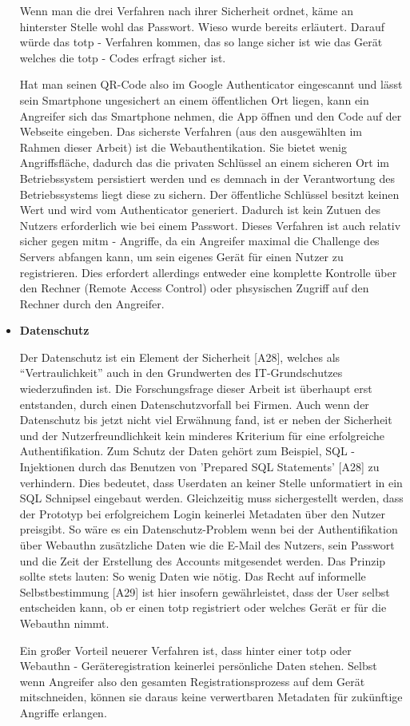 \begin{itemize}
Wenn man die drei Verfahren nach ihrer Sicherheit ordnet, käme an hinterster Stelle wohl das Passwort. Wieso wurde bereits erläutert. Darauf würde das \ac{totp} - Verfahren kommen, das so lange sicher ist wie das Gerät welches die \ac{totp} - Codes erfragt sicher ist.

Hat man seinen QR-Code also im Google Authenticator eingescannt und lässt sein Smartphone ungesichert an einem öffentlichen Ort liegen, kann ein Angreifer sich das Smartphone nehmen, die App öffnen und den Code auf der Webseite eingeben. Das sicherste Verfahren (aus den ausgewählten im Rahmen dieser Arbeit) ist die Webauthentikation. Sie bietet wenig Angriffsfläche, dadurch das die privaten Schlüssel an einem sicheren Ort im Betriebssystem persistiert werden und es demnach in der Verantwortung des Betriebssystems liegt diese zu sichern. Der öffentliche Schlüssel besitzt keinen Wert und wird vom Authenticator generiert. Dadurch ist kein Zutuen des Nutzers erforderlich wie bei einem Passwort. Dieses Verfahren ist auch relativ sicher gegen \ac{mitm} - Angriffe, da ein Angreifer maximal die Challenge des Servers abfangen kann, um sein eigenes Gerät für einen Nutzer zu registrieren. Dies erfordert allerdings entweder eine komplette Kontrolle über den Rechner (Remote Access Control) oder phsysischen Zugriff auf den Rechner durch den Angreifer.

\item \textbf{Datenschutz}

Der Datenschutz ist ein Element der Sicherheit [A28], welches als ``Vertraulichkeit'' auch in den Grundwerten des IT-Grundschutzes wiederzufinden ist. Die Forschungsfrage dieser Arbeit ist überhaupt erst entstanden, durch einen Datenschutzvorfall bei Firmen. Auch wenn der Datenschutz bis jetzt nicht viel Erwähnung fand, ist er neben der Sicherheit und der Nutzerfreundlichkeit kein minderes Kriterium für eine erfolgreiche Authentifikation. Zum Schutz der Daten gehört zum Beispiel, SQL - Injektionen durch das Benutzen von 'Prepared SQL Statements' [A28] zu verhindern. Dies bedeutet, dass Userdaten an keiner Stelle unformatiert in ein SQL Schnipsel eingebaut werden. Gleichzeitig muss sichergestellt werden, dass der Prototyp bei erfolgreichem Login keinerlei Metadaten über den Nutzer preisgibt. So wäre es ein Datenschutz-Problem wenn bei der Authentifikation über Webauthn zusätzliche Daten wie die E-Mail des Nutzers, sein Passwort und die Zeit der Erstellung des Accounts mitgesendet werden. Das Prinzip sollte stets lauten: So wenig Daten wie nötig. Das Recht auf informelle Selbstbestimmung [A29] ist hier insofern gewährleistet, dass der User selbst entscheiden kann, ob er einen \ac{totp} registriert oder welches Gerät er für die Webauthn nimmt.
\newpage

Ein großer Vorteil neuerer Verfahren ist, dass hinter einer \ac{totp} oder Webauthn - Geräteregistration keinerlei persönliche Daten stehen. Selbst wenn Angreifer also den gesamten Registrationsprozess auf dem Gerät mitschneiden, können sie daraus keine verwertbaren Metadaten für zukünftige Angriffe erlangen.
\end{itemize}
